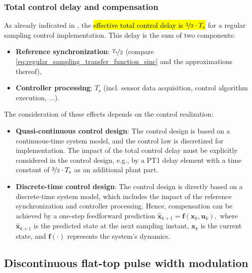 \begin{frame}
    \frametitle{Total control delay and compensation}
    As already indicated in , the \hl{effective total control delay is $\nicefrac{3}{2}\cdot T_\mathrm{s}$} for a regular sampling control implementation. This delay is the sum of two components:\pause
    \begin{itemize}
        \item \textbf{Reference synchronization}: $\nicefrac{T_\mathrm{s}}{2}$ (compare \eqref{eq:regular_sampling_transfer_function_sinc} and the approximations thereof),\pause
        \item \textbf{Controller processing}: $T_\mathrm{s}$ (incl. sensor data acquisition, control algorithm execution, ...).
    \end{itemize}\pause
    The consideration of these effects depends on the control realization:
    \begin{itemize}
        \item \textbf{Quasi-continuous control design}: The control design is based on a continuous-time system model, and the control law is discretized for implementation. The impact of the total control delay must be explicitly considered in the control design, e.g., by a PT1 delay element with a time constant of $\nicefrac{3}{2}\cdot T_\mathrm{s}$ as an additional plant part.\pause
        \item \textbf{Discrete-time control design}: The control design is directly based on a discrete-time system model, which includes the impact of the reference synchronization and controller processing. Hence, compensation can be achieved by a one-step feedforward prediction $\hat{\bm{x}}_{k+1} = \bm{f}(\bm{x}_k, \bm{u}_k),$ where $\hat{\bm{x}}_{k+1}$ is the predicted state at the next sampling instant, $\bm{x}_k$ is the current state, and $\bm{f}(\cdot)$ represents the system's dynamics.
    \end{itemize}
\end{frame}


\subsection{Discontinuous flat-top pulse width modulation}

